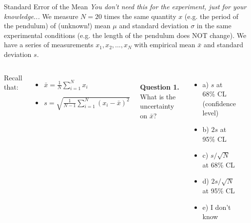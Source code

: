 \documentclass[9pt, xcolor=dvipsnames]{beamer}
\begin{document}
\begin{frame}{Standard Error of the Mean }
\textit{You don't need this for the experiment, just for your knowledge...}
	\justify
	We measure $N = 20$ times the same quantity $x$ (e.g. the period of the pendulum) of (unknown!) mean $\mu$ and standard deviation $\sigma$ in the same experimental conditions (e.g. the length of the pendulum does NOT change). We have a series of measurements $x_1, x_2, ..., x_N$ with  empirical mean $\bar{x}$ and standard deviation $s$.
	\newline
	
	\begin{columns}
		
		Recall that:
		\begin{itemize}
			\item $\bar{x} = \frac{1}{N} \sum_{i=1}^{N} x_i$ \\
			\item $s = \sqrt{ \frac{1}{N-1} \sum_{i=1}^{N} (x_i-\bar{x})^2 }$
		\end{itemize}
		
		~\\
		\textbf{Question 1.} What is the uncertainty on $\bar{x}$?
		\begin{itemize}
			\item[] a) $s$ at 68\% CL (confidence level)
			\item[] b) $2s$ at 95\% CL
			\item[] c) $s/\sqrt{N}$ at 68\% CL
			\item[] d) $2s/\sqrt{N}$ at 95\% CL
			\item[] e) I don't know
		\end{itemize}
		
			
		~\\
		~\\
		~\\
		~\\
		~\\
		~\\
		~\\
		~\\
		~\\
		~\\
		~\\
		~\\
		~\\
		~\\
		~\\				
	\end{columns}
	
\end{frame}



%	
%	
%	
%		
%	



%	
%
\end{document}
